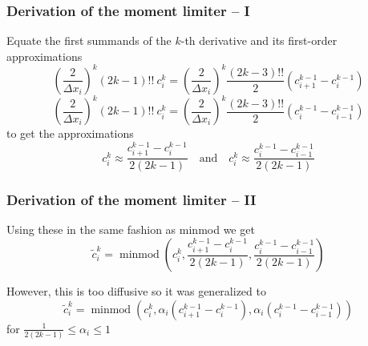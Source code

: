 \documentclass[11pt]{beamer}
\DeclareMathOperator{\minmod}{minmod}
\begin{document}
\begin{frame}
  \frametitle{Derivation of the moment limiter -- I}
  Equate the first summands of the $k$-th derivative and its first-order approximations
  \begin{equation*}
    \left( \frac{2}{\Delta x_{i}} \right)^{k} \left( 2k - 1 \right)!!~c_{i}^{k} = \left( \frac{2}{\Delta x_{i}} \right)^{k} \frac{(2k - 3)!!}{2} (c_{i + 1}^{k - 1} - c_{i}^{k - 1})
  \end{equation*}
  \begin{equation*}
    \left( \frac{2}{\Delta x_{i}} \right)^{k} \left( 2k - 1 \right)!!~c_{i}^{k} = \left( \frac{2}{\Delta x_{i}} \right)^{k} \frac{(2k - 3)!!}{2} (c_{i}^{k - 1} - c_{i - 1}^{k - 1})
  \end{equation*}
  to get the approximations
  \begin{equation*}
    c_{i}^{k} \approx \frac{c_{i + 1}^{k - 1} - c_{i}^{k - 1}}{2(2k - 1)} \quad \text{and} \quad c_{i}^{k} \approx \frac{c_{i}^{k - 1} - c_{i - 1}^{k - 1}}{2(2k - 1)}
  \end{equation*}
\end{frame}

\begin{frame}
  \frametitle{Derivation of the moment limiter -- II}
  Using these in the same fashion as minmod we get
  \begin{equation*}
    \tilde{c}_{i}^{k} = \minmod\left( c_{i}^{k}, \frac{c_{i + 1}^{k - 1} - c_{i}^{k - 1}}{2(2k - 1)}, \frac{c_{i}^{k - 1} - c_{i - 1}^{k - 1}}{2(2k - 1)} \right)
  \end{equation*}

  However, this is too diffusive so it was generalized to
  \begin{equation*}
    \tilde{c}_{i}^{k} = \minmod\left( c_{i}^{k}, \alpha_{i} \left( c_{i + 1}^{k - 1} - c_{i}^{k - 1} \right), \alpha_{i} \left( c_{i}^{k - 1} - c_{i - 1}^{k - 1} \right) \right)
  \end{equation*}
  for $\frac{1}{2(2k - 1)} \le \alpha_{i} \le 1$
\end{frame}
\end{document}
